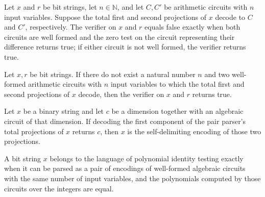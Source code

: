 \begin{theorem}
\label{Randomized.pitVerifier_of_decode}
\leanok
{}
Let $x$ and $r$ be bit strings, let $n\in\mathbb{N}$, and let $C,C'$ be arithmetic
circuits with $n$ input variables. Suppose the total first and second projections of $x$
decode to $C$ and $C'$, respectively. The verifier on $x$ and $r$ equals false exactly
when both circuits are well formed and the zero test on the circuit representing their
difference returns true; if either circuit is not well formed, the verifier returns
true.
\end{theorem}

\begin{theorem}
\label{Randomized.pitVerifier_of_not}
\leanok
{}
Let $x,r$ be bit strings. If there do not exist a natural number $n$ and two well-formed
arithmetic circuits with $n$ input variables to which the total first and second
projections of $x$ decode, then the verifier on $x$ and $r$ returns true.
\end{theorem}

\begin{theorem}
\label{Randomized.eq_pairEncode_of_decode}
\leanok
{}
Let $x$ be a binary string and let $c$ be a dimension together with an algebraic circuit
of that dimension. If decoding the first component of the pair parser’s total
projections of $x$ returns $c$, then $x$ is the self-delimiting encoding of those two
projections.
\end{theorem}

\begin{theorem}
\label{Randomized.mem_PITLang_iff}
\leanok
{}
A bit string $x$ belongs to the language of polynomial identity testing exactly when it
can be parsed as a pair of encodings of well-formed algebraic circuits with the same
number of input variables, and the polynomials computed by those circuits over the
integers are equal.
\end{theorem}

